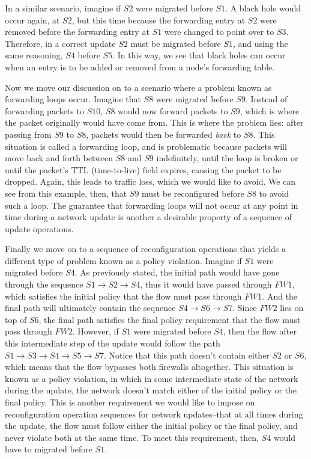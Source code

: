 \documentclass[pageno]{jpaper}
\begin{document}
In a similar scenario, imagine if $S2$ were migrated before $S1$. A black hole would occur again, at $S2$, but this time because the forwarding entry at $S2$ were removed before the forwarding entry at $S1$ were changed to point over to $S3$. Therefore, in a correct update $S2$ must be migrated before $S1$, and using the same reasoning, $S4$ before $S5$. In this way, we see that black holes can occur when an entry is to be added or removed from a node's forwarding table.

Now we move our discussion on to a scenario where a problem known as forwarding loops occur. Imagine that $S8$ were migrated before $S9$. Instead of forwarding packets to $S10$, $S8$ would now forward packets to $S9$, which is where the packet originally would have come from. This is where the problem lies: after passing from $S9$ to $S8$, packets would then be forwarded \textit{back} to $S8$. This situation is called a forwarding loop, and is problematic because packets will move back and forth between $S8$ and $S9$ indefinitely, until the loop is broken or until the packet's TTL (time-to-live) field expires, causing the packet to be dropped. Again, this leads to traffic loss, which we would like to avoid. We can see from this example, then, that $S9$ must be reconfigured before $S8$ to avoid such a loop. The guarantee that forwarding loops will not occur at any point in time during a network update is another a desirable property of a sequence of update operations.

Finally we move on to a sequence of reconfiguration operations that yields a different type of problem known as a policy violation. Imagine if $S1$ were migrated before $S4$. As previously stated, the initial path would have gone through the sequence $S1 \rightarrow S2 \rightarrow S4$, thus it would have passed through $FW1$, which satisfies the initial policy that the flow must pass through $FW1$. And the final path will ultimately contain the sequence $S4 \rightarrow S6 \rightarrow S7$. Since $FW2$ lies on top of $S6$, the final path satisfies the final policy requirement that the flow must pass through $FW2$. However, if $S1$ were migrated before $S4$, then the flow after this intermediate step of the update would follow the path $S1 \rightarrow S3 \rightarrow S4 \rightarrow S5 \rightarrow S7$. Notice that this path doesn't contain either $S2$ or $S6$, which means that the flow bypasses both firewalls altogether. This situation is known as a policy violation, in which in some intermediate state of the network during the update, the network doesn't match either of the initial policy or the final policy. This is another requirement we would like to impose on reconfiguration operation sequences for network updates--that at all times during the update, the flow must follow either the initial policy or the final policy, and never violate both at the same time. To meet this requirement, then, $S4$ would have to migrated before $S1$.
\end{document}
